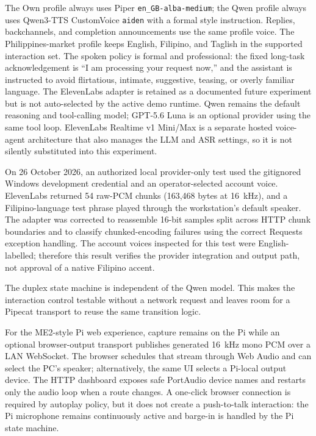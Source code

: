 \documentclass[sigconf,nonacm]{acmart}
\begin{document}
The Own profile always uses Piper \texttt{en\_GB-alba-medium}; the Qwen profile
always uses Qwen3-TTS CustomVoice \texttt{aiden} with a formal style
instruction. Replies, backchannels, and
completion announcements use the same profile voice. The Philippines-market
profile keeps English, Filipino, and Taglish in the supported interaction set.
The spoken policy is formal and professional: the fixed long-task acknowledgement
is ``I am processing your request now,'' and the assistant is instructed to
avoid flirtatious, intimate, suggestive, teasing, or overly familiar language.
The ElevenLabs adapter is retained as a documented future experiment but is
not auto-selected by the active demo runtime.
Qwen remains the default reasoning and tool-calling model; GPT-5.6 Luna is an
optional provider using the same tool loop. ElevenLabs Realtime v1
Mini/Max is a separate hosted voice-agent architecture that also manages the
LLM and ASR settings, so it is not silently substituted into this experiment.

On 26 October 2026, an authorized local provider-only test used the
gitignored Windows development credential and an operator-selected account
voice. ElevenLabs returned 54 raw-PCM chunks (163,468 bytes at 16~kHz), and a
Filipino-language test phrase played through the workstation's default
speaker. The adapter was corrected to reassemble 16-bit samples split across
HTTP chunk boundaries and to classify chunked-encoding failures using the
correct Requests exception handling. The account voices inspected
for this test were English-labelled; therefore this result verifies the
provider integration and output path, not approval of a native Filipino
accent.

The duplex state machine is independent of the Qwen model. This makes the
interaction control testable without a network request and leaves room for a
Pipecat transport to reuse the same transition logic.

For the ME2-style Pi web experience, capture remains on the Pi while an
optional browser-output transport publishes generated 16~kHz mono PCM over a
LAN WebSocket. The browser schedules that stream through Web Audio and can
select the PC's speaker; alternatively, the same UI selects a Pi-local output
device. The HTTP dashboard exposes safe PortAudio device names and restarts
only the audio loop when a route changes. A one-click browser connection is
required by autoplay policy, but it does not create a push-to-talk interaction:
the Pi microphone remains continuously active and barge-in is handled by the
Pi state machine.
\end{document}
